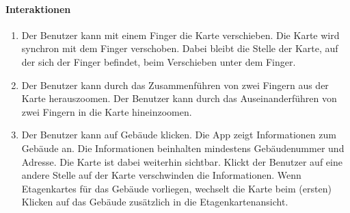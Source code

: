 \paragraph{Interaktionen}
\begin{enumerate}[start=12, label=\textbf{/FA\arabic*/}, align=left]
    \item Der \Gls{Benutzer} kann mit einem Finger die \Gls{Karte} verschieben. Die \Gls{Karte} wird synchron mit dem Finger verschoben. Dabei bleibt die Stelle der \Gls{Karte}, auf der sich der Finger befindet, beim Verschieben unter dem Finger.
    \item Der \Gls{Benutzer} kann durch das Zusammenführen von zwei Fingern aus der \Gls{Karte} herauszoomen. Der \Gls{Benutzer} kann durch das Auseinanderführen von zwei Fingern in die \Gls{Karte} hineinzoomen.
    \item Der \Gls{Benutzer} kann auf Gebäude klicken. Die App zeigt Informationen zum Gebäude an. Die Informationen beinhalten mindestens Gebäudenummer und Adresse. Die \Gls{Karte} ist dabei weiterhin sichtbar. Klickt der \Gls{Benutzer} auf eine andere Stelle auf der \Gls{Karte} verschwinden die Informationen. Wenn \Glspl{Etagenkarte} für das Gebäude vorliegen, wechselt die \Gls{Karte} beim (ersten) Klicken auf das Gebäude zusätzlich in die \Gls{Etagenkartenansicht}.
\end{enumerate}